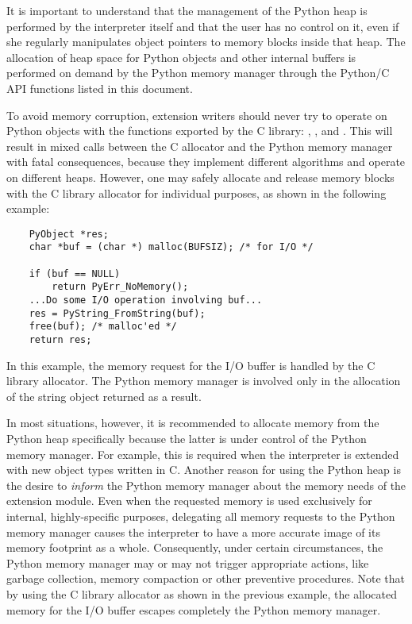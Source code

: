\documentclass{manual}
\begin{document}
It is important to understand that the management of the Python heap
is performed by the interpreter itself and that the user has no
control on it, even if she regularly manipulates object pointers to
memory blocks inside that heap.  The allocation of heap space for
Python objects and other internal buffers is performed on demand by
the Python memory manager through the Python/C API functions listed in
this document.

To avoid memory corruption, extension writers should never try to
operate on Python objects with the functions exported by the C
library: ,
,
 and
.  This will result in 
mixed calls between the C allocator and the Python memory manager
with fatal consequences, because they implement different algorithms
and operate on different heaps.  However, one may safely allocate and
release memory blocks with the C library allocator for individual
purposes, as shown in the following example:

\begin{verbatim}
    PyObject *res;
    char *buf = (char *) malloc(BUFSIZ); /* for I/O */

    if (buf == NULL)
        return PyErr_NoMemory();
    ...Do some I/O operation involving buf...
    res = PyString_FromString(buf);
    free(buf); /* malloc'ed */
    return res;
\end{verbatim}

In this example, the memory request for the I/O buffer is handled by
the C library allocator. The Python memory manager is involved only
in the allocation of the string object returned as a result.

In most situations, however, it is recommended to allocate memory from
the Python heap specifically because the latter is under control of
the Python memory manager. For example, this is required when the
interpreter is extended with new object types written in C. Another
reason for using the Python heap is the desire to \emph{inform} the
Python memory manager about the memory needs of the extension module.
Even when the requested memory is used exclusively for internal,
highly-specific purposes, delegating all memory requests to the Python
memory manager causes the interpreter to have a more accurate image of
its memory footprint as a whole. Consequently, under certain
circumstances, the Python memory manager may or may not trigger
appropriate actions, like garbage collection, memory compaction or
other preventive procedures. Note that by using the C library
allocator as shown in the previous example, the allocated memory for
the I/O buffer escapes completely the Python memory manager.
\end{document}
